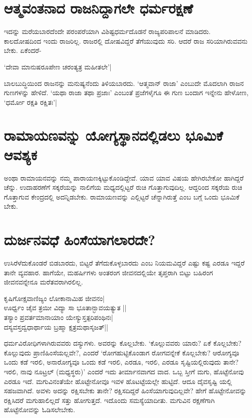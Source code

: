 \section*{ಆತ್ಮವಂತನಾದ ರಾಜನಿದ್ದಾಗಲೇ ಧರ್ಮರಕ್ಷಣೆ}

ಇದನ್ನು ಮರೆಯಬಾರದೆಂದೇ ಪರಂಪರೆಯಾಗಿ ವಿಶಿಷ್ಟಧರ್ಮದೊಡನೆ ರಾಜ್ಯಪರಿಪಾಲನೆ ಮಾಡಿದರು. ಕಾಲದೋಷದಿಂದ ಇಂದು ರಾಜರಿಲ್ಲ. ರಾಜರಲ್ಲಿ ದೋಷವಿದ್ದರೆ ತೆಗೆಯುವುದು ಸರಿ. ಆದರೆ ರಾಜ ಸರಿಯಾಗಿರುವವನು ಬೇಕು. ಏಕೆಂದರೆ-

\begin{shloka}
`ದೇವಾ ಮಾನುಷರೂಪೇಣ ಚರಂತ್ಯತ್ರ ಮಹೀತಲೇ'|\label{225b}
\end{shloka}

ಬಾಲಬುದ್ಧಿಯಿಂದ ರಾಜನನ್ನು ಮನುಷ್ಯನೆಂದು ತಿಳಿಯಬಾರದು. `ಆತ್ಮವಾನ್ ರಾಜಾ' ಎಂಬುದೇ ಮೊದಲಾಗಿ ರಾಜನ ಗುಣಗಳನ್ನು ಹೇಳಿದೆ. `ಯಥಾ ರಾಜಾ ತಥಾ ಪ್ರಜಾಃ'\label{225c} ಎಂಬಂತೆ ಪ್ರಜೆಗಳೈಗೂ ಈ ಗುಣ ಬಂದಾಗ ಇನ್ನೇನು ಹೇಳೋಣ, `ಧರ್ಮೋ ರಕ್ಷತಿ ರಕ್ಷಿತಃ'|\label{225}

\section*{ರಾಮಾಯಣವನ್ನು ಯೋಗ್ಯಸ್ಥಾನದಲ್ಲಿಡಲು ಭೂಮಿಕೆ ಆವಶ್ಯಕ}

ಅಂಥಾ ರಾಮಾಯನವನ್ನು ನಮ್ಮ ಪಾರಾಯಣಕ್ಕಿಟ್ಟುಕೊಂಡಿದ್ದೇವೆ. ಯಾವ ಯಾವ ವಿಷಯ ಹೇಗಿರಬೇಕೋ ಹಾಗಿದ್ದರೆ ಚೆನ್ನು. ಉದಾಹರಣೆಗೆ ಸಕ್ಕರೆಯನ್ನು ನಾಲಿಗೆಯ ಮಧ್ಯದಲ್ಲಿಟ್ಟರೆ ರುಚಿ ಗೊತ್ತಾಗುವುದಿಲ್ಲ. ಆದ್ದರಿಂದ ಸಕ್ಕರೆಯ ರುಚಿ ಗೊತ್ತಾಗುವ ಕೇಂದ್ರದಲ್ಲಿ ಅದನ್ನಿಡಬೇಕು. ರಾಮಾಯಣವನ್ನು ಎಲ್ಲಿಟ್ಟರೆ ಚೆನ್ನಾಗಿರುತ್ತೆ ಎಂಬ ಬಗ್ಗೆ ಒಂದು ಭೂಮಿಕೆ ಬೇಕು.

\section*{ದುರ್ಜನವಧೆ ಹಿಂಸೆಯಾಗಲಾರದೇ?}

ಉಸಿರೆಳೆದುಕೊಂಡರೆ ಬಿಡಬಾರದು, ಬಿಟ್ಟರೆ ತೆಗೆದುಕೊಳ್ಳಬಾರದು ಎಂಬ ನಿಯಮವಿದ್ದರೆ ಎಷ್ಟು ಕಷ್ಟ ಎರಡೂ ಇದ್ದರೆ ತಾನೇ ವ್ಯವಹಾರ. ಹಾಗೆಯೇ, ಮಹರ್ಷಿಗಳು ಅಂತರಂಗ ಜೀವನದಲ್ಲಿಯೇ ತೃಪ್ತರಾಗಿ ಬಿಟ್ಟು ಬಹಿರಂಗ ಜೀವನವನ್ನೇನೂ ಮರೆತವರಾಗಿರಲಿಲ್ಲ.

\begin{shloka}
ಕೃಷಿಗೋಕ್ಷವಾಣಿಜ್ಯಂ ಲೋಕಾನಾಮಿಹ ಜೀವನಂ|\label{225a}\\
ಊರ್ಧ್ವಂ ಚೈವ ತ್ರಯೀ ವಿದ್ಯಾ ಸಾ‌ ಭೂತಾನ್ಭಾವಯತ್ಯುತ ||\\
ತಸ್ಯಾಂ ಪ್ರವರ್ತಮಾನಾಯಾಂ ಯೇಸ್ಯುಸ್ತತ್ಪರಿಪಂಥಿನಃ|\\
ದಸ್ಯವಸ್ತದ್ವಧಾರ್ಥಾಯ ಬ್ರಹ್ಮಾ ಕ್ಷತ್ರಮಥಾಸೃಜತ್||
\end{shloka}
ಧರ್ಮವಿರೋಧಿಗಳಾಗಿರುವವರು ದಸ್ಯುಗಳು. ಅವರನ್ನು ಕೊಲ್ಲಬೇಕು. `ಕೊಲ್ಲುವವರು ಯಾರು? ಏಕೆ ಕೊಲ್ಲಬೇಕು? ಕೊಲ್ಲುವುದು ಪ್ರಾಣಿಹಿಂಸೆಯಲ್ಲವೇ?, ಎಂದರೆ `ರೋಗಹುಟ್ಟಿಕೊಂಡಾಗ ರೋಗವನ್ನೇಕೆ ಕೊಲ್ಲಬೇಕು? ಆರೋಗ್ಯವೂ ಒಂದು ಕಡೆ ಇರಲಿ, ಅನಾರೋಗ್ಯವೂ ಒಂದು ಕಡೆ ಇರಲಿ, ಎರಡೂ, ಇರಲಿ, ಎರಡೂ ಸೃಷ್ಟಿಯಲ್ಲಿರುವುದು ತಾನೇ? ಇರಲಿ, ನಾವು ನೂಟ್ರಲ್ (ಮಧ್ಯಸ್ಥರು)' ಎಂದರೆ ಇದು ತೀರ್ಮಾನವಾಗದ ವಾದ. ಒಬ್ಬ ಸ್ತೀಗೆ ಮಗು, ಹೊಟ್ಟೆನೋವು ಎರಡೂ ಇದೆ. ಮಗುವಿನಂತೆಯೇ ಹೊಟ್ಟೇನೋವೂ ಇವಳ ಹೊಟಟ್ಟೆಯಲ್ಲೇ ಹುಟ್ಟಿದೆ. ಆದೂ ದೈವಸೃಷ್ಟಿ ಯಲ್ಲಿ ಸಹಜವಾಗಿದೆ. ಅವಳು ಅದನ್ನು ರಕ್ಷಿಸಬೇಕು ತಾನೇ? ರಕ್ಷಿಸದಿದ್ದರೆ ಹಿಂಸೆಯಾಗುವುದಿಲ್ಲವೇ? ಹೇಗೆ ಹೊಟ್ಟೇನೋವನ್ನು ರಕ್ಷಿಸಿದರೆ ಮಗುಹಾಲಿಲ್ಲದೆ ಸತ್ತು ಹೋಗುತ್ತದೆ. ಇದೊಂದು ಸಮಸ್ಯೆಯಾದೀತು. ಮಗುವಿನ ರಕ್ಷಣೆಗಾಗಿ ಹೊಟ್ಟೆನೋವನ್ನು ಓಡಿಸಲೇಬೇಕು.

